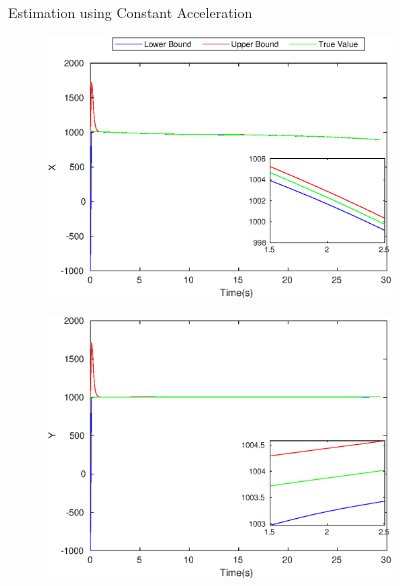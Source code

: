 \begin{figure}[h]
\begin{subfigure}{.5\linewidth}
\end{subfigure}
\caption{Estimation using Constant Acceleration}
\end{figure}



\begin{figure}[h]
\begin{subfigure}{.5\linewidth}
\centering
\includegraphics[width=\linewidth]{figures/HInf/s3csHInfX}
\end{subfigure}
\begin{subfigure}{.5\linewidth}
\centering
\includegraphics[width=\linewidth]{figures/HInf/s3csHInfY}
\end{subfigure}
\begin{subfigure}{.5\linewidth}

\end{subfigure}
\end{figure}
